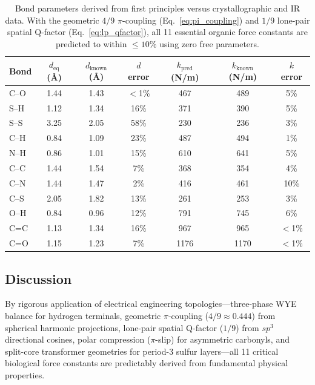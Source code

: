 \begin{table}[h]
\centering
\begin{tabular}{lcccccc}
\hline
\textbf{Bond} & $d_\text{eq}$ (\AA) & $d_\text{known}$ (\AA) & $d$ error & $k_\text{pred}$ (N/m) & $k_\text{known}$ (N/m) & $k$ error \\
\hline
C--O  & 1.44  & 1.43  & $<$1\%  & 467   & 489   & 5\%  \\
S--H  & 1.12  & 1.34  & 16\%  & 371   & 390   & 5\%  \\
S--S  & 3.25  & 2.05  & 58\%  & 230   & 236   & 3\%  \\
C--H  & 0.84  & 1.09  & 23\%  & 487   & 494   & 1\%  \\
N--H  & 0.86  & 1.01  & 15\%  & 610   & 641   & 5\%  \\
C--C  & 1.44  & 1.54  & 7\%   & 368   & 354   & 4\%  \\
C--N  & 1.44  & 1.47  & 2\%   & 416   & 461   & 10\% \\
C--S  & 2.05  & 1.82  & 13\%  & 261   & 253   & 3\%  \\
O--H  & 0.84  & 0.96  & 12\%  & 791   & 745   & 6\%  \\
C=C   & 1.13  & 1.34  & 16\%  & 967   & 965   & $<$1\%  \\
C=O   & 1.15  & 1.23  & 7\%   & 1176  & 1170  & $<$1\% \\
\hline
\end{tabular}
\caption{Bond parameters derived from first principles versus crystallographic and IR data. With the geometric $4/9$ $\pi$-coupling (Eq.~\ref{eq:pi_coupling}) and $1/9$ lone-pair spatial Q-factor (Eq.~\ref{eq:lp_qfactor}), all 11 essential organic force constants are predicted to within $\leq 10\%$ using zero free parameters.}
\label{tab:first_principles_k}
\end{table}

\subsection{Discussion}

By rigorous application of electrical engineering topologies---three-phase WYE balance for hydrogen terminals, geometric $\pi$-coupling ($4/9 \approx 0.444$) from spherical harmonic projections, lone-pair spatial Q-factor ($1/9$) from $sp^3$ directional cosines, polar compression ($\pi$-slip) for asymmetric carbonyls, and split-core transformer geometries for period-3 sulfur layers---all 11 critical biological force constants are predictably derived from fundamental physical properties. 

